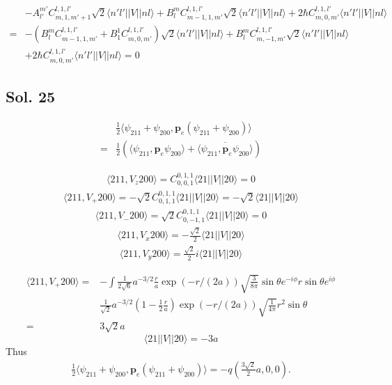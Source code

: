 \begin{enumerate}
\begin{itemize}
\begin{align*}
        &-A^{m'}_{l'}
        C^{l,1,l'}_{m,1,m'+1}
        \sqrt{2}\langle n'l'||V||nl\rangle
        +B^m_l 
        C^{l,1,l'}_{m-1,1,m'}\sqrt{2}
        \langle n'l'||V||nl\rangle
        +2\hbar C^{l,1,l'}_{m,0,m'}
        \langle n'l'||V||nl\rangle\\
        =&
        -(B^m_lC^{l,1,l'}_{m-1,1,m'}+B^{1}_1C^{l,1,l'}_{m,0,m'})
        \sqrt{2}\langle n'l'||V||nl\rangle
        +B^m_l 
        C^{l,1,l'}_{m,-1,m'}\sqrt{2}
        \langle n'l'||V||nl\rangle\\
        &+2\hbar C^{l,1,l'}_{m,0,m'}
        \langle n'l'||V||nl\rangle=0
    \end{align*}
    \end{itemize}
    
\end{enumerate}

\subsection*{Sol. 25}
\begin{align*}
    &\frac{1}{2}\langle \psi_{211}+\psi_{200}, \bm p_e(\psi_{211}+\psi_{200})\rangle\\
    =&\frac{1}{2}
    (\langle\psi_{211},\bm p_e\psi_{200}\rangle+\overline{\langle\psi_{211},\bm p_e\psi_{200}\rangle})
\end{align*}

\begin{align*}
    \langle 211, V_z200\rangle
    =C^{0,1,1}_{0,0,1}\langle 21||V||20\rangle=0
\end{align*}
\begin{align*}
    \langle 211, V_+200\rangle
    =-\sqrt{2}C^{0,1,1}_{0,1,1}\langle 21||V||20\rangle=-\sqrt{2}\langle 21||V||20\rangle
\end{align*}
\begin{align*}
    \langle 211, V_-200\rangle
    =\sqrt{2}C^{0,1,1}_{0,-1,1}\langle 21||V||20\rangle=0
\end{align*}
\begin{align*}
    \langle 211,V_x 200\rangle = -\frac{\sqrt{2}}{2}\langle 21||V||20\rangle
\end{align*}
\begin{align*}
    \langle 211,V_y 200\rangle = \frac{\sqrt{2}}{2}i\langle 21||V||20\rangle
\end{align*}

\begin{align*}
    \langle 211,V_+200\rangle =&
    -
    \int \frac{1}{2\sqrt{6}}a^{-3/2}\frac{r}{a}\exp(-r/(2a))
    \sqrt{\frac{3}{8\pi}}\sin\theta e^{-i\phi}
    r\sin\theta e^{i\phi}\\
    &\frac{1}{\sqrt{2}}a^{-3/2}(1-\frac{1}{2}\frac{r}{a})\exp(-r/(2a))
    \sqrt{\frac{1}{4\pi}}
    r^2\sin\theta\\
    =&
    3\sqrt{2}a
\end{align*}
$$
\langle 21||V||20\rangle= -3a
$$
Thus 
\begin{align*}
    \frac{1}{2}\langle \psi_{211}+\psi_{200}, \bm p_e(\psi_{211}+\psi_{200})\rangle=
    -q(\frac{3\sqrt{2}}{2}a,0,0).
\end{align*}

